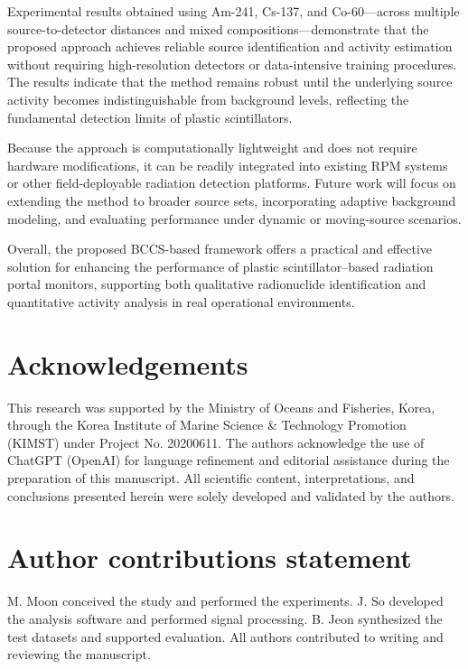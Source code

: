 \documentclass[10pt]{wlscirep}
\begin{document}
Experimental results obtained using Am-241, Cs-137, and Co-60—across multiple source-to-detector distances and mixed compositions—demonstrate that the proposed approach achieves reliable source identification and activity estimation without requiring high-resolution detectors or data-intensive training procedures. The results indicate that the method remains robust until the underlying source activity becomes indistinguishable from background levels, reflecting the fundamental detection limits of plastic scintillators.

Because the approach is computationally lightweight and does not require hardware modifications, it can be readily integrated into existing RPM systems or other field-deployable radiation detection platforms. Future work will focus on extending the method to broader source sets, incorporating adaptive background modeling, and evaluating performance under dynamic or moving-source scenarios.

Overall, the proposed BCCS-based framework offers a practical and effective solution for enhancing the performance of plastic scintillator–based radiation portal monitors, supporting both qualitative radionuclide identification and quantitative activity analysis in real operational environments.

\section*{Acknowledgements}

This research was supported by the Ministry of Oceans and Fisheries, Korea, through the Korea Institute of Marine Science \& Technology Promotion (KIMST) under Project No. 20200611. The authors acknowledge the use of ChatGPT (OpenAI) for language refinement and editorial assistance during the preparation of this manuscript. All scientific content, interpretations, and conclusions presented herein were solely developed and validated by the authors.

\section*{Author contributions statement}
M. Moon conceived the study and performed the experiments. J. So developed the analysis software and performed signal processing. B. Jeon synthesized the test datasets and supported evaluation. All authors contributed to writing and reviewing the manuscript.


\end{document}
